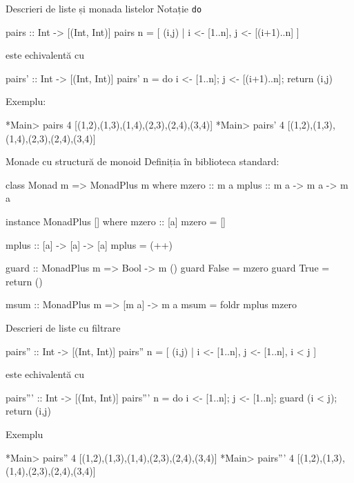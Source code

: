 \documentclass[xcolor=pdftex,romanian,colorlinks]{beamer}
\begin{document}


\begin{frame}[fragile]{Descrieri de liste și monada listelor}
{Notație \lstinline$do$}
\begin{asciihs}
   pairs :: Int -> [(Int, Int)]
   pairs n = [ (i,j) | i <- [1..n], j <- [(i+1)..n] ]
\end{asciihs}
este echivalentă cu
\begin{asciihs}
   pairs' :: Int -> [(Int, Int)]
   pairs' n = do {
                  i <- [1..n];
                  j <- [(i+1)..n];
                  return (i,j)
                }
\end{asciihs}
Exemplu:
\begin{asciihs}
   *Main> pairs 4
   [(1,2),(1,3),(1,4),(2,3),(2,4),(3,4)]
   *Main> pairs' 4
   [(1,2),(1,3),(1,4),(2,3),(2,4),(3,4)]
\end{asciihs}
\end{frame}


\begin{frame}[fragile]{Monade cu structură de monoid}
\vspace{-1ex}
Definiția în biblioteca standard:
\begin{asciihs}
   class Monad m => MonadPlus m where
     mzero :: m a
     mplus :: m a -> m a -> m a

   instance MonadPlus [] where
      mzero     :: [a]
      mzero     = []

      mplus     :: [a] -> [a] -> [a]
      mplus     = (++)

   guard :: MonadPlus m => Bool -> m ()
   guard False = mzero
   guard True   = return ()

   msum :: MonadPlus m => [m a] -> m a
   msum = foldr mplus mzero
\end{asciihs}
\end{frame}



\begin{frame}[fragile]{Descrieri de liste cu filtrare}
\begin{asciihs}
   pairs'' :: Int -> [(Int, Int)]
   pairs'' n = [ (i,j) | i <- [1..n], j <- [1..n], i < j ]
\end{asciihs}
este echivalentă cu
\begin{asciihs}
   pairs''' :: Int -> [(Int, Int)]
   pairs''' n = do {
                    i <- [1..n];
                    j <- [1..n];
                    guard (i < j);
                    return (i,j)
                  }
\end{asciihs}
Exemplu
\begin{asciihs}
   *Main> pairs'' 4
   [(1,2),(1,3),(1,4),(2,3),(2,4),(3,4)]
   *Main> pairs''' 4
   [(1,2),(1,3),(1,4),(2,3),(2,4),(3,4)]
\end{asciihs}
\end{frame}
\end{document}
